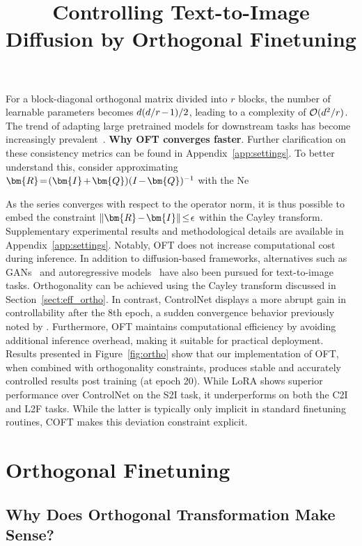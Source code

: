 \title{Controlling Text-to-Image Diffusion by Orthogonal Finetuning}
For a block-diagonal orthogonal matrix divided into $r$ blocks, the number of learnable parameters becomes $\thickmuskip=2mu \medmuskip=2mu d(d/r-1)/2$, leading to a complexity of $\thickmuskip=2mu \medmuskip=2mu \mathcal{O}(d^2/r)$. The trend of adapting large pretrained models for downstream tasks has become increasingly prevalent~\cite{devlin2018bert,brown2020language,he2022masked}. \textbf{Why OFT converges faster}. Further clarification on these consistency metrics can be found in Appendix~\ref{app:settings}. To better understand this, consider approximating $\thickmuskip=2mu \medmuskip=2mu \bm{R}=(\bm{I}+\bm{Q})(I-\bm{Q})^{-1}$ with the Ne

As the series converges with respect to the operator norm, it is thus possible to embed the constraint $\thickmuskip=2mu \medmuskip=2mu\|\bm{R}-\bm{I}\|\leq\epsilon$ within the Cayley transform. Supplementary experimental results and methodological details are available in Appendix~\ref{app:settings}. Notably, OFT does not increase computational cost during inference. In addition to diffusion-based frameworks, alternatives such as GANs~\cite{reed2016generative,zhang2017stackgan,xu2018attngan,li2019controllable} and autoregressive models~\cite{ramesh2021zero,ding2021cogview,wu2022nuwa,yuscaling} have also been pursued for text-to-image tasks. Orthogonality can be achieved using the Cayley transform discussed in Section~\ref{sect:eff_ortho}. In contrast, ControlNet displays a more abrupt gain in controllability after the 8th epoch, a sudden convergence behavior previously noted by \cite{zhang2023adding}. Furthermore, OFT maintains computational efficiency by avoiding additional inference overhead, making it suitable for practical deployment. Results presented in Figure~\ref{fig:ortho} show that our implementation of OFT, when combined with orthogonality constraints, produces stable and accurately controlled results post training (at epoch 20). While LoRA shows superior performance over ControlNet on the S2I task, it underperforms on both the C2I and L2F tasks. While the latter is typically only implicit in standard finetuning routines, COFT makes this deviation constraint explicit. \section{Orthogonal Finetuning}

\subsection{Why Does Orthogonal Transformation Make Sense?}

